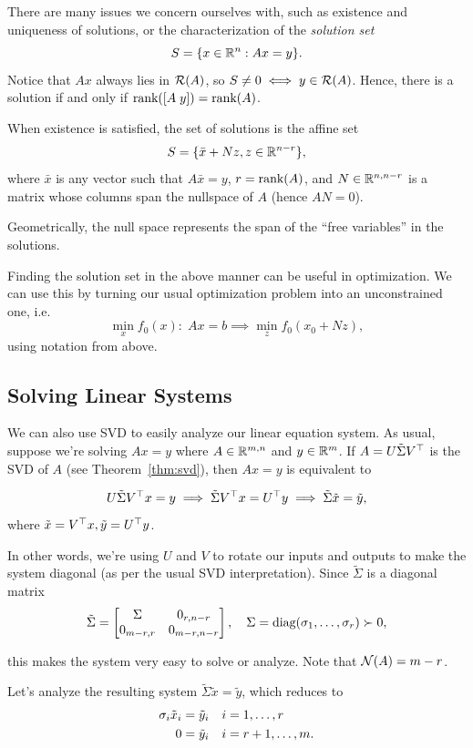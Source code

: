 \documentclass[11 pt]{scrartcl}
\begin{document}
There are many issues we concern ourselves with, such as existence and uniqueness of solutions, or the characterization of the \emph{solution set} 
\[ S = \{x\in \mathbb R^n : Ax=y\}.\] 
Notice that $Ax$ always lies in $\mathcal R(A)$, so $S\not= 0 \iff y \in \mathcal R(A)$. 
Hence, there is a solution if and only if $\text{rank} ([A\; y]) = \text{rank} (A)$. 

When existence is satisfied, the set of solutions is the affine set 
\[ S = \{\bar{x} + Nz, z\in \mathbb R^{n-r} \},\] 
where $\bar{x}$ is any vector such that $A\bar{x} = y$, $r = \text{rank} (A)$, and $N \in \mathbb R^{n, n-r}$ is a matrix whose columns span the nullspace of $A$ (hence $AN = 0$). 

Geometrically, the null space represents the span of the ``free variables'' in the solutions.

Finding the solution set in the above manner can be useful in optimization. We can use this by turning our usual optimization problem into an unconstrained one, i.e. 
\[ \min_x f_0(x) :\; Ax = b \implies \min_z f_0(x_0 + Nz),\] 
using notation from above. 

\subsection{Solving Linear Systems}
We can also use SVD to easily analyze our linear equation system.
As usual, suppose we're solving $Ax = y$ where $A\in \mathbb R^{m,n}$ and $y\in \mathbb R^m$. 
If $A = U\tilde{\Sigma} V^\top$ is the SVD of $A$ (see Theorem~\ref{thm:svd}), then $Ax = y$ is equivalent to 

\[ U\tilde{\Sigma} V^\top x = y \implies \tilde{\Sigma} V^\top x = U^\top y \implies \tilde{\Sigma} \tilde{x} = \tilde{y},\] 
where $\tilde{x} = V^\top x, \tilde{y} = U^\top y$. 

In other words, we're using $U$ and $V$ to rotate our inputs and outputs to make the system diagonal (as per the usual SVD interpretation). 
Since $\tilde{\Sigma}$ is a diagonal matrix 
\[ \tilde{\Sigma} = \begin{bmatrix} \Sigma & 0_{r, n-r} \\ 0_{m-r, r} & 0_{m-r, n-r} \end{bmatrix},\quad \Sigma = \text{diag}(\sigma_1, \dots, \sigma_r) \succ 0,\]

this makes the system very easy to solve or analyze.
Note that $\mathcal N(A) = m-r$. 

Let's analyze the resulting system $\tilde{\Sigma}\tilde{x} = \tilde{y}$, which reduces to 
\begin{align*}
    \sigma_i \tilde{x}_i &= \tilde{y}_i \quad i = 1, \dots, r \\ 
    0 &= \tilde{y}_i \quad i = r+1, \dots, m.
\end{align*}
\end{document}
